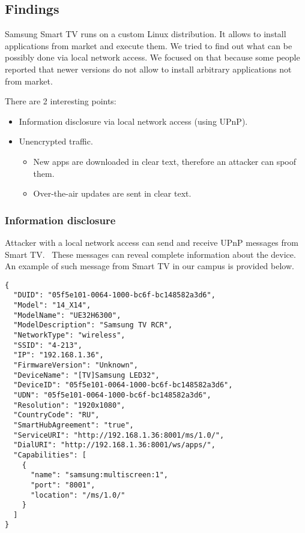 \subsection{Findings}

Samsung Smart TV runs on a custom Linux distribution. It allows to install applications from market and execute them. We tried to find out what can be possibly done via local network access. We focused on that because some people reported that newer versions do not allow to install arbitrary applications not from market.

There are 2 interesting points:

\begin{itemize}
\item{}
Information disclosure via local network access (using UPnP).
\item{}
Unencrypted traffic.
\begin{itemize}
\item{}
New apps are downloaded in clear text, therefore an attacker can spoof them.
\item{}
Over-the-air updates are sent in clear text.
\end{itemize}
\end{itemize}

\subsubsection{Information disclosure}

Attacker with a local network access can send and receive UPnP messages from Smart TV.~\cite{smart-tv} These messages can reveal complete information about the device. An example of such message from Smart TV in our campus is provided below.

\begin{lstlisting}
{
  "DUID": "05f5e101-0064-1000-bc6f-bc148582a3d6",
  "Model": "14_X14",
  "ModelName": "UE32H6300",
  "ModelDescription": "Samsung TV RCR",
  "NetworkType": "wireless",
  "SSID": "4-213",
  "IP": "192.168.1.36",
  "FirmwareVersion": "Unknown",
  "DeviceName": "[TV]Samsung LED32",
  "DeviceID": "05f5e101-0064-1000-bc6f-bc148582a3d6",
  "UDN": "05f5e101-0064-1000-bc6f-bc148582a3d6",
  "Resolution": "1920x1080",
  "CountryCode": "RU",
  "SmartHubAgreement": "true",
  "ServiceURI": "http://192.168.1.36:8001/ms/1.0/",
  "DialURI": "http://192.168.1.36:8001/ws/apps/",
  "Capabilities": [
    {
      "name": "samsung:multiscreen:1",
      "port": "8001",
      "location": "/ms/1.0/"
    }
  ]
}
\end{lstlisting}

